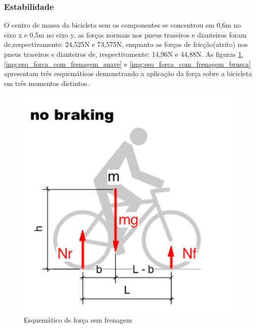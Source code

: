 \newpage

	\subsubsection{Estabilidade}
	O centro de massa da bicicleta sem os componentes se concentrou em 0,6m no eixo x e 0,5m no eixo y, as forças normais nos pneus traseiros e dianteiros foram de,respectivamente: 24,525N e 73,575N, enquanto as forças de fricção(atrito)  nos pneus traseiros e dianteiros de, respectivamente: 14,96N e 44,88N. As figuras \ref{img:esq_forca_sem_frenagem}, \ref{img:esq_forca_com_frenagem_suave} e \ref{img:esq_forca_com_frenagem_brusca} apresentam três esquemáticos demonstrando a aplicação da força sobre a bicicleta em três momentos distintos.

		\graphicspath{{figuras/}}
		\begin{figure}[H]
		\centering
		\includegraphics[scale=0.80]{esq_forca_sem_frenagem.png}
		\caption{Esquemático de força sem frenagem}
		\label{img:esq_forca_sem_frenagem}
		\end{figure}

